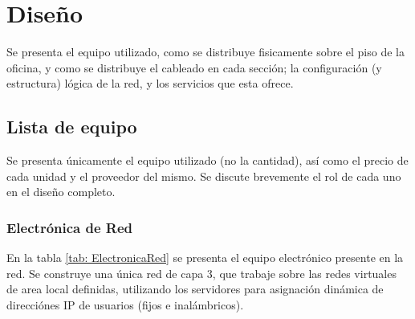 \section{Diseño}
    
    Se presenta el equipo utilizado, como se distribuye fisicamente sobre
    el piso de la oficina, y como se distribuye el cableado en cada
    sección; la configuración (y estructura) lógica de la red, y los
    servicios que esta ofrece.

    \subsection{Lista de equipo}
        
        Se presenta únicamente el equipo utilizado (no la cantidad),
        así como el precio de cada unidad y el proveedor del mismo.
        Se discute brevemente el rol de cada uno en el diseño completo. 

        \subsubsection{Electrónica de Red}
            
            En la tabla \ref{tab: ElectronicaRed} se presenta el equipo
            electrónico presente en la red. Se construye una única red
            de capa 3, que trabaje sobre las redes virtuales de area 
            local definidas, utilizando los servidores para asignación
            dinámica de direcciónes IP de usuarios (fijos e 
            inalámbricos).
            

            \newcommand{\ColumnQuantity}{4}
            \newcommand{\f}{\footnotesize}
            \newcommand{\Router}{https://www.router-switch.com/cisco-isr4331-k9-p-16544.html}
            \newcommand{\Switch}{https://www.router-switch.com/ws-c2960-24tc-s-p-5255.html}
            \newcommand{\AccessPoint}{https://www.amazon.com/TP-Link-EAP610-Business-Wireless-Integrated/dp/B09G5H4XS2?th=1}
            \newcommand{\APsheet}{https://www.tp-link.com/baltic/business-networking/omada-sdn-access-point/eap610/#specifications}
            \newcommand{\Server}{https://www.theserverstore.com/cisco-ucs-c220-m5-10-bay-1u-rackmount-server.html}
            \newcommand{\ServerDatasheet}{https://www.cisco.com/c/en/us/products/collateral/servers-unified-computing/ucs-c-series-rack-servers/datasheet-c78-739281.html}


